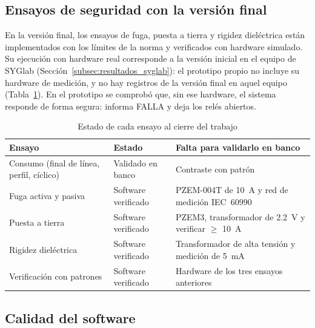 \subsection{Ensayos de seguridad con la versión final}
\label{subsec:resultados_seguridad}

En la versión final, los ensayos de fuga, puesta a tierra y rigidez dieléctrica
están implementados con los límites de la norma y verificados con hardware
simulado. Su ejecución con hardware real corresponde a la versión inicial en el
equipo de SYGlab (Sección~\ref{subsec:resultados_syglab}): el prototipo propio no
incluye su hardware de medición, y no hay registros de la versión final en
aquel equipo (Tabla~\ref{tab:estado_ensayos}). En el prototipo se comprobó que, sin ese
hardware, el sistema responde de forma segura: informa FALLA y deja los relés
abiertos.

\begin{table}[htbp]
\centering
\caption{Estado de cada ensayo al cierre del trabajo}
\label{tab:estado_ensayos}
\renewcommand{\arraystretch}{1.25}
\small
\begin{tabularx}{\linewidth}{@{} l l X @{}}
\toprule
\textbf{Ensayo} & \textbf{Estado} & \textbf{Falta para validarlo en banco} \\
\midrule
Consumo (final de línea, perfil, cíclico) & Validado en banco & Contraste con patrón \\
Fuga activa y pasiva & Software verificado
  & PZEM-004T de \SI{10}{\ampere} y red de medición IEC~60990 \\
Puesta a tierra & Software verificado
  & PZEM3, transformador de \SI{2,2}{\volt} y verificar $\geq$ \SI{10}{\ampere} \\
Rigidez dieléctrica & Software verificado
  & Transformador de alta tensión y medición de \SI{5}{\milli\ampere} \\
Verificación con patrones & Software verificado & Hardware de los tres ensayos anteriores \\
\bottomrule
\end{tabularx}
\end{table}

\subsection{Calidad del software}
\label{subsec:resultados_software}

